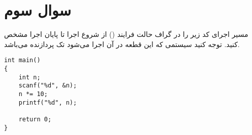 \section{سوال سوم}

مسیر اجرای کد زیر را در گراف حالت فرایند () از شروع اجرا تا پایان اجرا مشخص کنید. توجه کنید سیستمی که این قطعه در آن اجرا می‌شود تک پردازنده می‌باشد.


\begin{latin}
\begin{lstlisting}[caption=Code of Q3, label=cpp_code_example]
int main()
{
	int n;
	scanf("%d", &n);
	n *= 10;
	printf("%d", n);
	
	return 0;
}
\end{lstlisting}
\end{latin}
